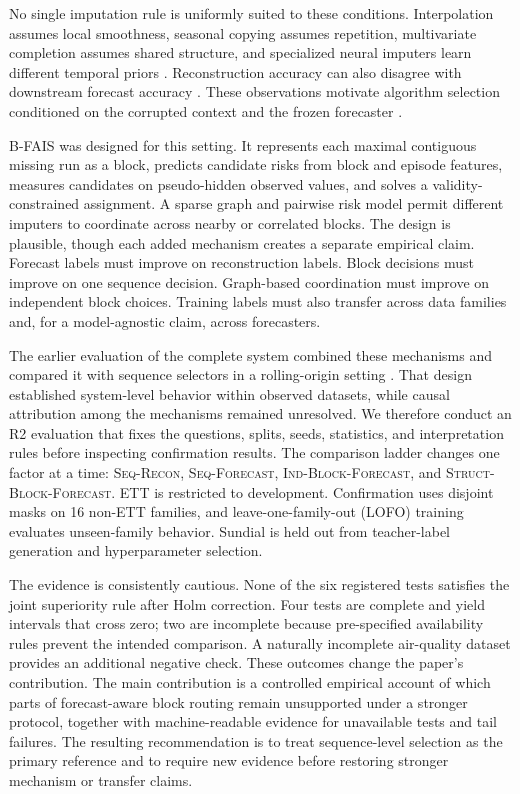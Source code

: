 \documentclass{article}
\newcommand{\bfais}{\textsc{B-FAIS}\xspace}
\newcommand{\segrecon}{\textsc{Seq-Recon}\xspace}
\newcommand{\segforecast}{\textsc{Seq-Forecast}\xspace}
\newcommand{\indblock}{\textsc{Ind-Block-Forecast}\xspace}
\newcommand{\strblock}{\textsc{Struct-Block-Forecast}\xspace}
\begin{document}
No single imputation rule is uniformly suited to these conditions. Interpolation assumes local smoothness, seasonal copying assumes repetition, multivariate completion assumes shared structure, and specialized neural imputers learn different temporal priors \citep{vanbuuren2011mice,stekhoven2012missforest,mazumder2010softimpute,cao2018brits,tashiro2021csdi,du2023saits,nie2024imputeformer}. Reconstruction accuracy can also disagree with downstream forecast accuracy \citep{wang2024taskoriented}. These observations motivate algorithm selection conditioned on the corrupted context and the frozen forecaster \citep{rice1976algorithm,misir2017alors,zhao2021automatic,hazimeh2021dselect,zhou2020neuralucb}.

\bfais was designed for this setting. It represents each maximal contiguous missing run as a block, predicts candidate risks from block and episode features, measures candidates on pseudo-hidden observed values, and solves a validity-constrained assignment. A sparse graph and pairwise risk model permit different imputers to coordinate across nearby or correlated blocks. The design is plausible, though each added mechanism creates a separate empirical claim. Forecast labels must improve on reconstruction labels. Block decisions must improve on one sequence decision. Graph-based coordination must improve on independent block choices. Training labels must also transfer across data families and, for a model-agnostic claim, across forecasters.

The earlier evaluation of the complete system combined these mechanisms and compared it with sequence selectors in a rolling-origin setting \citep{tashman2000outofsample}. That design established system-level behavior within observed datasets, while causal attribution among the mechanisms remained unresolved. We therefore conduct an R2 evaluation that fixes the questions, splits, seeds, statistics, and interpretation rules before inspecting confirmation results. The comparison ladder changes one factor at a time: \segrecon, \segforecast, \indblock, and \strblock. ETT is restricted to development. Confirmation uses disjoint masks on 16 non-ETT families, and leave-one-family-out (LOFO) training evaluates unseen-family behavior. Sundial \citep{liu2025sundial} is held out from teacher-label generation and hyperparameter selection.

The evidence is consistently cautious. None of the six registered tests satisfies the joint superiority rule after Holm correction. Four tests are complete and yield intervals that cross zero; two are incomplete because pre-specified availability rules prevent the intended comparison. A naturally incomplete air-quality dataset provides an additional negative check. These outcomes change the paper's contribution. The main contribution is a controlled empirical account of which parts of forecast-aware block routing remain unsupported under a stronger protocol, together with machine-readable evidence for unavailable tests and tail failures. The resulting recommendation is to treat sequence-level selection as the primary reference and to require new evidence before restoring stronger mechanism or transfer claims.
\end{document}
